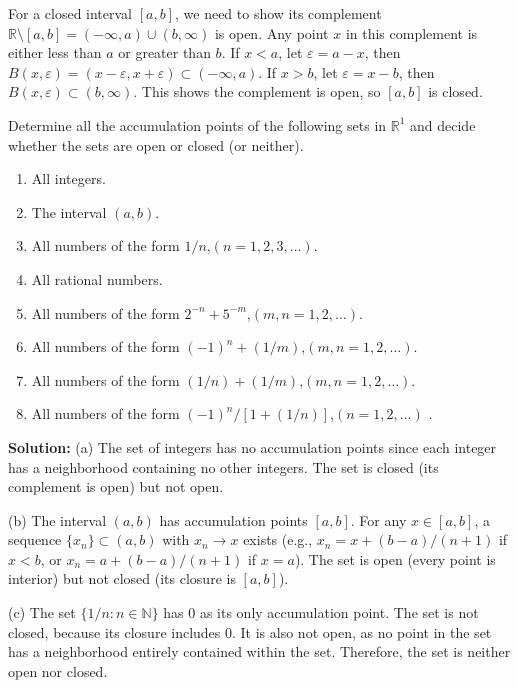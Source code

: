 For a closed interval $[a,b]$, we need to show its complement $\mathbb{R} \setminus [a,b] = (-\infty,a) \cup (b,\infty)$ is open. Any point $x$ in this complement is either less than $a$ or greater than $b$. If $x < a$, let $\varepsilon = a-x$, then $B(x,\varepsilon) = (x-\varepsilon, x+\varepsilon) \subset (-\infty,a)$. If $x > b$, let $\varepsilon = x-b$, then $B(x,\varepsilon) \subset (b,\infty)$. This shows the complement is open, so $[a,b]$ is closed.

\begin{problembox}
Determine all the accumulation points of the following sets in $\mathbb{R}^1$ and decide whether the sets are open or closed (or neither).
\begin{enumerate}[label=\textbf{(\alph*)}]
\item All integers.
\item The interval $(a, b)$.
\item All numbers of the form $1/n$,\quad $(n = 1, 2, 3, \dots)$.
\item All rational numbers.
\item All numbers of the form $2^{-n} + 5^{-m}$,\quad $(m, n = 1, 2, \dots)$.
\item All numbers of the form $(-1)^n + (1/m)$,\quad $(m, n = 1, 2, \dots)$.
\item All numbers of the form $(1/n) + (1/m)$,\quad $(m, n = 1, 2, \dots)$.
\item All numbers of the form $(-1)^n / [1 + (1/n)]$,\quad $(n = 1, 2, \dots)$
.
\end{enumerate}
\end{problembox}

\textbf{Solution:} 
(a) The set of integers has no accumulation points since each integer has a neighborhood containing no other integers. The set is closed (its complement is open) but not open.

(b) The interval $(a,b)$ has accumulation points $[a,b]$. For any $x \in [a,b]$, a sequence $\{x_n\} \subset (a,b)$ with $x_n \to x$ exists (e.g., $x_n = x + (b-a)/(n+1)$ if $x < b$, or $x_n = a + (b-a)/(n+1)$ if $x = a$). The set is open (every point is interior) but not closed (its closure is $[a,b]$).

(c) The set $\{1/n : n \in \mathbb{N}\}$ has 0 as its only accumulation point. The set is not closed, because its closure includes 0. It is also not open, as no point in the set has a neighborhood entirely contained within the set. Therefore, the set is neither open nor closed.


